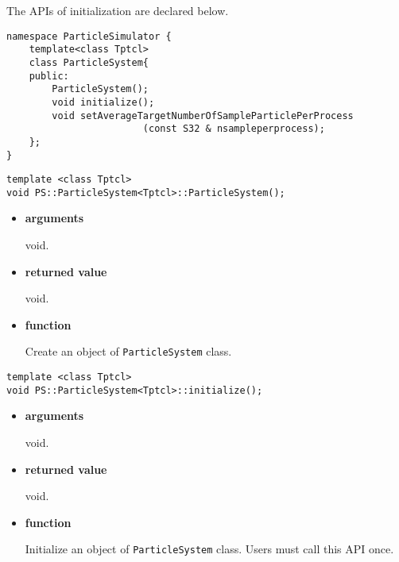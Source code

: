 The APIs of initialization are declared below.

\begin{lstlisting}[caption=ParticleSystem1]
namespace ParticleSimulator {
    template<class Tptcl>
    class ParticleSystem{
    public:
        ParticleSystem();
        void initialize();
        void setAverageTargetNumberOfSampleParticlePerProcess
                        (const S32 & nsampleperprocess);
    };
}
\end{lstlisting}



\begin{screen}
\begin{verbatim}
template <class Tptcl>
void PS::ParticleSystem<Tptcl>::ParticleSystem();
\end{verbatim}
\end{screen}

\begin{itemize}

\item {\bf arguments}

void.

\item {\bf returned value}

void.

\item {\bf function}

Create an object of {\tt ParticleSystem} class.

\end{itemize}


\begin{screen}
\begin{verbatim}
template <class Tptcl> 
void PS::ParticleSystem<Tptcl>::initialize();
\end{verbatim}
\end{screen}

\begin{itemize}

\item {\bf arguments}

void.

\item {\bf returned value}

void.

\item {\bf function}

Initialize an object of {\tt ParticleSystem} class. Users must call
this API once.


\end{itemize}

